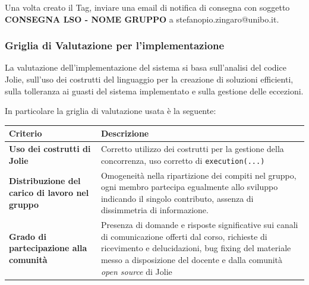 \documentclass[
]{article}
\begin{document}
Una volta creato il Tag, inviare una email di notifica di consegna con
soggetto \textbf{CONSEGNA LSO - NOME GRUPPO} a
stefanopio.zingaro@unibo.it.

\hypertarget{griglia-di-valutazione-per-limplementazione}{%
\subsubsection{Griglia di Valutazione per
l'implementazione}\label{griglia-di-valutazione-per-limplementazione}}

La valutazione dell'implementazione del sistema si basa sull'analisi del
codice Jolie, sull'uso dei costrutti del linguaggio per la creazione di
soluzioni efficienti, sulla tolleranza ai guasti del sistema
implementato e sulla gestione delle eccezioni.

In particolare la griglia di valutazione usata è la seguente:

\begin{longtable}[]{@{}ll@{}}
\toprule
\begin{minipage}[b]{0.47\columnwidth}\raggedright
Criterio\strut
\end{minipage} & \begin{minipage}[b]{0.47\columnwidth}\raggedright
Descrizione\strut
\end{minipage}\tabularnewline
\midrule
\endhead
\begin{minipage}[t]{0.47\columnwidth}\raggedright
\textbf{Uso dei costrutti di Jolie}\strut
\end{minipage} & \begin{minipage}[t]{0.47\columnwidth}\raggedright
Corretto utilizzo dei costrutti per la gestione della concorrenza, uso
corretto di \texttt{execution(...)}\strut
\end{minipage}\tabularnewline
\begin{minipage}[t]{0.47\columnwidth}\raggedright
\textbf{Distribuzione del carico di lavoro nel gruppo}\strut
\end{minipage} & \begin{minipage}[t]{0.47\columnwidth}\raggedright
Omogeneità nella ripartizione dei compiti nel gruppo, ogni membro
partecipa egualmente allo sviluppo indicando il singolo contributo,
assenza di dissimmetria di informazione.\strut
\end{minipage}\tabularnewline
\begin{minipage}[t]{0.47\columnwidth}\raggedright
\textbf{Grado di partecipazione alla comunità}\strut
\end{minipage} & \begin{minipage}[t]{0.47\columnwidth}\raggedright
Presenza di domande e risposte significative sui canali di comunicazione
offerti dal corso, richieste di ricevimento e delucidazioni, bug fixing
del materiale messo a disposizione del docente e dalla comunità
\emph{open source} di Jolie\strut
\end{minipage}\tabularnewline
\bottomrule
\end{longtable}
\end{document}
